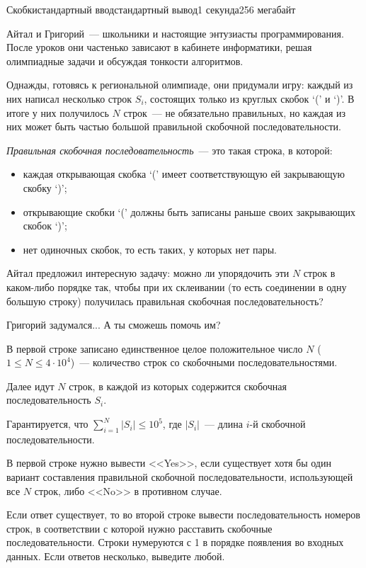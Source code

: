 \begin{problem}{Скобки}{стандартный ввод}{стандартный вывод}{1 секунда}{256 мегабайт}

Айтал и Григорий~--- школьники и настоящие энтузиасты программирования. После уроков они частенько зависают в кабинете информатики, решая олимпиадные задачи и обсуждая тонкости алгоритмов.

Однажды, готовясь к региональной олимпиаде, они придумали игру: каждый из них написал несколько строк $S_i$, состоящих только из круглых скобок `(' и `)'. В итоге у них получилось $N$ строк~--- не обязательно правильных, но каждая из них может быть частью большой правильной скобочной последовательности.

\textit{Правильная скобочная последовательность}~--- это такая строка, в которой:
\begin{itemize}
\item каждая открывающая скобка `(' имеет соответствующую ей закрывающую скобку `)';
\item открывающие скобки `(' должны быть записаны раньше своих закрывающих скобок `)';
\item нет одиночных скобок, то есть таких, у которых нет пары.
\end{itemize}

Айтал предложил интересную задачу: можно ли упорядочить эти $N$ строк в каком-либо порядке так, чтобы при их склеивании (то есть соединении в одну большую строку) получилась правильная скобочная последовательность?

Григорий задумался... А ты сможешь помочь им?

\InputFile
В первой строке записано единственное целое положительное число $N$ ($1 \leq N \leq 4\cdot10^4$)~--- количество строк со скобочными последовательностями.

Далее идут $N$ строк, в каждой из которых содержится скобочная последовательность $S_i$.

Гарантируется, что $\displaystyle \sum_{i=1}^{N} \left| S_i \right| \leq 10^5$, где $\left| S_i \right|$~--- длина $i$-й скобочной последовательности.

\OutputFile
В первой строке нужно вывести <<Yes>>, если существует хотя бы один вариант составления правильной скобочной последовательности, использующей все $N$ строк, либо <<No>> в противном случае.

Если ответ существует, то во второй строке вывести последовательность номеров строк, в соответствии с которой нужно расставить скобочные последовательности. Строки нумеруются с 1 в порядке появления во входных данных. Если ответов несколько, выведите любой.

\Example

\begin{example}
%
\end{example}

\end{problem}

